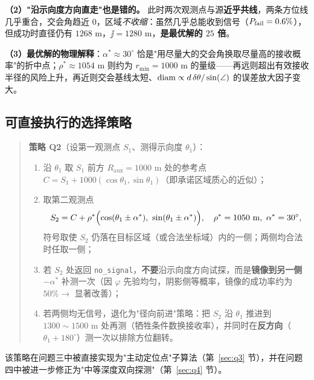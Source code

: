 \noindent\textbf{（2）"沿示向度方向直走"也是错的。} 此时两次观测点与源\textbf{近乎共线}，两条方位线几乎重合，交会角趋近 $0$，区域\emph{不收缩}：虽然几乎总能收到信号（$P_{\rm fail}=0.6\%$），但成功时直径仍有 $1268$ m，$\jj=1280$ m，\textbf{是最优解的 $25$ 倍}。

\noindent\textbf{（3）最优解的物理解释}：$\alpha^*\approx30^\circ$ 恰是"用尽量大的交会角换取尽量高的接收概率"的折中点；$\rho^*\approx1054$ m 则约为 $r_{\min}=1000$ m 的量级——再远则超出有效接收半径的风险上升，再近则交会基线太短、$\operatorname{diam}\propto d\,\delta\theta/\sin(\angle)$ 的误差放大因子变大。

\subsection{可直接执行的选择策略}

\begin{quote}
\textbf{策略 Q2}（设第一观测点 $S_1$、测得示向度 $\theta_1$）：
\begin{enumerate}
  \item 沿 $\theta_1$ 取 $S_1$ 前方 $R_{\text{aux}}=1000$ m 处的参考点 $C=S_1+1000(\cos\theta_1,\sin\theta_1)$（即承诺区域质心的近似）；
  \item 取第二观测点
  \begin{equation}
  S_2=C+\rho^*\Bigl(\cos(\theta_1\pm\alpha^*),\ \sin(\theta_1\pm\alpha^*)\Bigr),\quad
  \rho^*=1050\ \text{m},\ \alpha^*=30^\circ,
  \end{equation}
  符号取使 $S_2$ 仍落在目标区域（或合法坐标域）内的一侧；两侧均合法时任取一侧；
  \item 若 $S_2$ 处返回 \texttt{no\_signal}，\textbf{不要}沿示向度方向试探，而是\textbf{镜像到另一侧} $-\alpha^*$ 补测一次（因 $\varphi$ 先验均匀，阴影侧等概率，镜像的成功率约为 $50\%\to$ 显著改善）；
  \item 若两侧均无信号，退化为"径向前进"策略：把 $S_2$ 沿 $\theta_1$ 推进到 $1300\!\sim\!1500$ m 处再测（牺牲条件数换接收率），并同时在\textbf{反方向}（$\theta_1+180^\circ$）测一次以排除方位翻转。
\end{enumerate}
\end{quote}

该策略在问题三中被直接实现为"主动定位点"子算法（第~\ref{sec:q3} 节），并在问题四中被进一步修正为"中等深度双向探测"（第~\ref{sec:q4} 节）。
